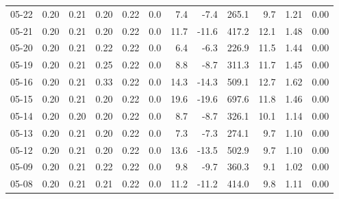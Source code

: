 \begin{threeparttable}
{\begin{tabular}{lrrrrrrrrrrr}
  05-22 &          0.20 &          0.21 &          0.20 &        0.22 &                 0.0 &                 7.4 &       -7.4 &               265.1 &              9.7 &            1.21 &                   0.00 \\
  05-21 &          0.20 &          0.21 &          0.20 &        0.22 &                 0.0 &                11.7 &      -11.6 &               417.2 &             12.1 &            1.48 &                   0.00 \\
  05-20 &          0.20 &          0.21 &          0.22 &        0.22 &                 0.0 &                 6.4 &       -6.3 &               226.9 &             11.5 &            1.44 &                   0.00 \\
  05-19 &          0.20 &          0.21 &          0.25 &        0.22 &                 0.0 &                 8.8 &       -8.7 &               311.3 &             11.7 &            1.45 &                   0.00 \\
  05-16 &          0.20 &          0.21 &          0.33 &        0.22 &                 0.0 &                14.3 &      -14.3 &               509.1 &             12.7 &            1.62 &                   0.00 \\
  05-15 &          0.20 &          0.21 &          0.20 &        0.22 &                 0.0 &                19.6 &      -19.6 &               697.6 &             11.8 &            1.46 &                   0.00 \\
  05-14 &          0.20 &          0.20 &          0.20 &        0.22 &                 0.0 &                 8.7 &       -8.7 &               326.1 &             10.1 &            1.14 &                   0.00 \\
  05-13 &          0.20 &          0.21 &          0.20 &        0.22 &                 0.0 &                 7.3 &       -7.3 &               274.1 &              9.7 &            1.10 &                   0.00 \\
  05-12 &          0.20 &          0.21 &          0.20 &        0.22 &                 0.0 &                13.6 &      -13.5 &               502.9 &              9.7 &            1.10 &                   0.00 \\
  05-09 &          0.20 &          0.21 &          0.22 &        0.22 &                 0.0 &                 9.8 &       -9.7 &               360.3 &              9.1 &            1.02 &                   0.00 \\
  05-08 &          0.20 &          0.21 &          0.21 &        0.22 &                 0.0 &                11.2 &      -11.2 &               414.0 &              9.8 &            1.11 &                   0.00 \\

\end{tabular}}
\end{threeparttable}

